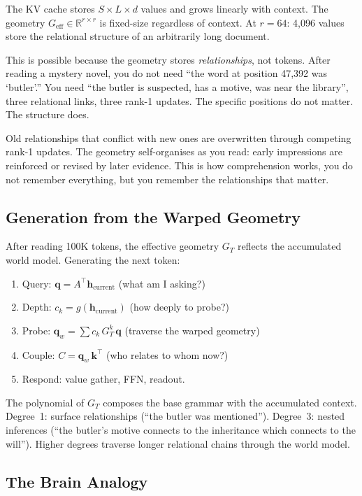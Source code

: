 \documentclass[11pt, a4paper]{article}
\newcommand{\h}{\mathbf{h}}
\newcommand{\R}{\mathbb{R}}
\theoremstyle{plain}
\theoremstyle{definition}
\theoremstyle{remark}
\begin{document}
The KV cache stores $S \times L \times d$ values and grows linearly with context.
The geometry $G_{\mathrm{eff}} \in \R^{r \times r}$ is fixed-size regardless of context.
At $r = 64$: 4,096 values store the relational structure of an arbitrarily long document.

This is possible because the geometry stores \emph{relationships}, not tokens.
After reading a mystery novel, you do not need ``the word at position 47,392 was `butler'.''
You need ``the butler is suspected, has a motive, was near the library'', three relational links, three rank-1 updates.
The specific positions do not matter.
The structure does.

Old relationships that conflict with new ones are overwritten through competing rank-1 updates.
The geometry self-organises as you read: early impressions are reinforced or revised by later evidence.
This is how comprehension works, you do not remember everything, but you remember the relationships that matter.

\subsection{Generation from the Warped Geometry}

After reading 100K tokens, the effective geometry $G_T$ reflects the accumulated world model.
Generating the next token:
\begin{enumerate}[nosep]
\item Query: $\mathbf{q} = A^\top \h_{\mathrm{current}}$ (what am I asking?)
\item Depth: $c_k = g(\h_{\mathrm{current}})$ (how deeply to probe?)
\item Probe: $\mathbf{q}_w = \sum c_k \, G_T^k \, \mathbf{q}$ (traverse the warped geometry)
\item Couple: $C = \mathbf{q}_w \, \mathbf{k}^\top$ (who relates to whom now?)
\item Respond: value gather, FFN, readout.
\end{enumerate}

The polynomial of $G_T$ composes the base grammar with the accumulated context.
Degree~1: surface relationships (``the butler was mentioned'').
Degree~3: nested inferences (``the butler's motive connects to the inheritance which connects to the will'').
Higher degrees traverse longer relational chains through the world model.

\subsection{The Brain Analogy}
\end{document}
